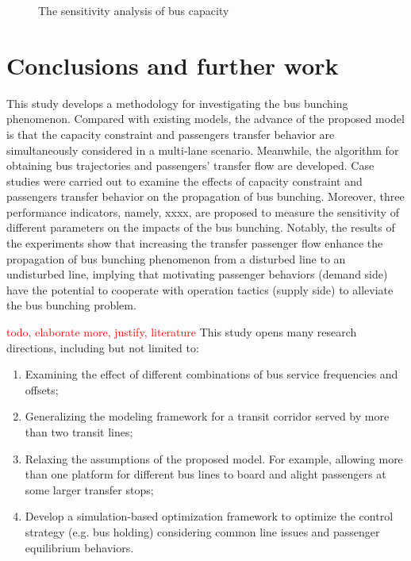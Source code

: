 \documentclass[smallextended]{svjour3}       %
\begin{document}
\begin{Abstract}
\begin{figure}[h]
\begin{tabular}{|c|c|}
      \end{tabular}
      \caption{The sensitivity analysis of bus capacity}
      \label{fig:cap ana}
  \end{figure}

\section{Conclusions and further work}\label{conclusions}
This study develops a methodology for investigating the bus bunching phenomenon.
Compared with existing models, the advance of the proposed model is that the capacity constraint and passengers transfer behavior are simultaneously considered in a multi-lane scenario. Meanwhile, the algorithm for obtaining bus trajectories and passengers' transfer flow are developed. 
Case studies were carried out to examine the effects of capacity constraint and passengers transfer behavior on the propagation of bus bunching. Moreover, three performance indicators, namely, xxxx, are proposed to measure the sensitivity of different parameters on the impacts of the bus bunching. Notably, the results of the experiments show that increasing the transfer passenger flow enhance the propagation of bus bunching phenomenon from a disturbed line to an undisturbed line, implying that motivating passenger behaviors (demand side) have the potential to cooperate with operation tactics (supply side) to alleviate the bus bunching problem.


\textcolor{red}{todo, elaborate more, justify, literature }
This study opens many research directions, including but not limited to: 
\begin{enumerate}[1)]
    \item Examining the effect of different combinations of bus service frequencies and offsets; 
    \item Generalizing the modeling framework for a transit corridor served by more than two transit lines; 
    \item Relaxing the assumptions of the proposed model. 
    For example, allowing more than one platform for different bus lines to board and alight passengers at some larger transfer stops; 
    \item Develop a simulation-based optimization framework to optimize the control strategy (e.g. bus holding) considering common line issues and passenger equilibrium behaviors.
\end{enumerate}



\end{Abstract}
\end{document}

